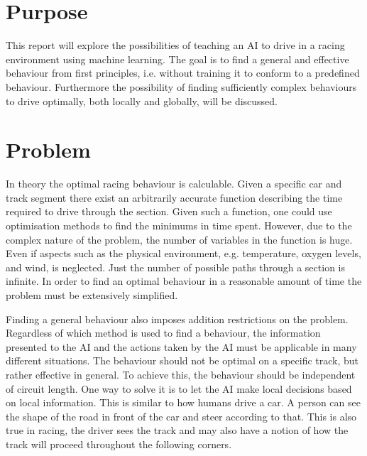 \section{Purpose}
This report will explore the possibilities of teaching an AI to drive in a racing environment using machine learning. The goal is to find a general and effective behaviour from first principles, i.e. without training it to conform to a predefined behaviour. Furthermore the possibility of finding sufficiently complex behaviours to drive optimally, both locally and globally, will be discussed. 

\section{Problem}


In theory the optimal racing behaviour is calculable. Given a specific car and track segment there exist an arbitrarily accurate function describing the time required to drive through the section. Given such a function, one could use optimisation methods to find the minimums in time spent. However, due to the complex nature of the problem, the number of variables in the function is huge. Even if aspects such as the physical environment, e.g. temperature, oxygen levels, and wind, is neglected. Just the number of possible paths through a section is infinite. In order to find an optimal behaviour in a reasonable amount of time the problem must be extensively simplified. 
    
Finding a general behaviour also imposes addition restrictions on the problem. Regardless of which method is used to find a behaviour, the information presented to the AI and the actions taken by the AI must be applicable in many different situations. The behaviour should not be optimal on a specific track, but rather effective in general. To achieve this, the behaviour should be independent of circuit length. One way to solve it is to let the AI make local decisions based on local information. This is similar to how humans drive a car. A person can see the shape of the road in front of the car and steer according to that. This is also true in racing, the driver sees the track and may also have a notion of how the track will proceed throughout the following corners.  

